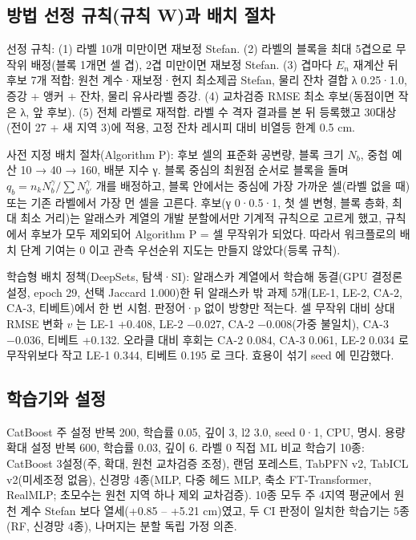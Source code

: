 \subsection{방법 선정 규칙(규칙 W)과 배치 절차}

선정 규칙: (1) 라벨 10개 미만이면 재보정 Stefan. (2) 라벨의 블록을 최대 5겹으로 무작위 배정(블록 1개면 셀 겹), 2겹 미만이면 재보정 Stefan. (3) 겹마다 $E_n$ 재계산 뒤 후보 7개 적합: 원천 계수·재보정·현지 최소제곱 Stefan, 물리 잔차 결합 λ 0.25·1.0, 증강 + 앵커 + 잔차, 물리 유사라벨 증강. (4) 교차검증 RMSE 최소 후보(동점이면 작은 λ, 앞 후보). (5) 전체 라벨로 재적합. 라벨 수 격자 결과를 본 뒤 등록했고 30대상(전이 27 + 새 지역 3)에 적용, 고정 잔차 레시피 대비 비열등 한계 0.5 cm.

사전 지정 배치 절차(Algorithm P): 후보 셀의 표준화 공변량, 블록 크기 $N_b$, 중첩 예산 10 → 40 → 160, 배분 지수 γ. 블록 중심의 최원점 순서로 블록을 돌며 $q_b = n_k N_b^{\gamma}/\sum N_{b'}^{\gamma}$ 개를 배정하고, 블록 안에서는 중심에 가장 가까운 셀(라벨 없을 때) 또는 기존 라벨에서 가장 먼 셀을 고른다. 후보(γ 0·0.5·1, 첫 셀 변형, 블록 층화, 최대 최소 거리)는 알래스카 계열의 개발 분할에서만 기계적 규칙으로 고르게 했고, 규칙에서 후보가 모두 제외되어 Algorithm P = 셀 무작위가 되었다. 따라서 워크플로의 배치 단계 기여는 0 이고 관측 우선순위 지도는 만들지 않았다(등록 규칙).

학습형 배치 정책(DeepSets, 탐색·SI): 알래스카 계열에서 학습해 동결(GPU 결정론 설정, epoch 29, 선택 Jaccard 1.000)한 뒤 알래스카 밖 과제 5개(LE-1, LE-2, CA-2, CA-3, 티베트)에서 한 번 시험. 판정어·p 없이 방향만 적는다. 셀 무작위 대비 상대 RMSE 변화 $v$ 는 LE-1 +0.408, LE-2 −0.027, CA-2 −0.008(가중 불일치), CA-3 −0.036, 티베트 +0.132. 오라클 대비 후회는 CA-2 0.084, CA-3 0.061, LE-2 0.034 로 무작위보다 작고 LE-1 0.344, 티베트 0.195 로 크다. 효용이 섞기 seed 에 민감했다.

\subsection{학습기와 설정}

CatBoost 주 설정 반복 200, 학습률 0.05, 깊이 3, l2 3.0, seed 0·1, CPU,  명시. 용량 확대 설정 반복 600, 학습률 0.03, 깊이 6. 라벨 0 직접 ML 비교 학습기 10종: CatBoost 3설정(주, 확대, 원천 교차검증 조정), 랜덤 포레스트, TabPFN v2, TabICL v2(미세조정 없음), 신경망 4종(MLP, 다중 헤드 MLP, 축소 FT-Transformer, RealMLP; 초모수는 원천 지역 하나 제외 교차검증). 10종 모두 주 4지역 평균에서 원천 계수 Stefan 보다 열세(+0.85 – +5.21 cm)였고, 두 CI 판정이 일치한 학습기는 5종(RF, 신경망 4종), 나머지는 분할 독립 가정 의존.


